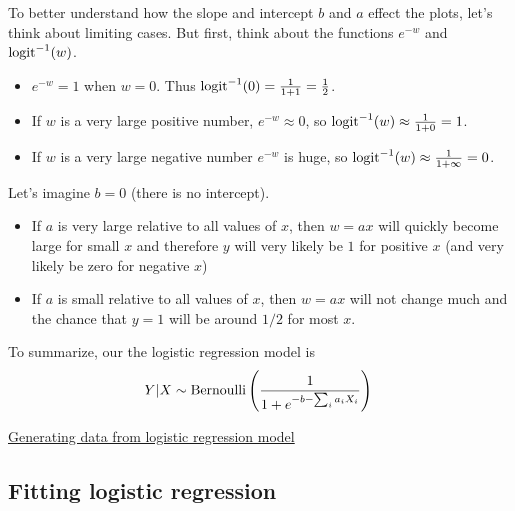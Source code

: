 To better understand how the slope and intercept $b$ and $a$ effect the plots, let's think about limiting cases. 
But first, think about the functions $e^{-w}$ and ${\rm logit}^{-1}(w)$. 

\begin{itemize}
\item $e^{-w} = 1$ when $w=0$. Thus $
{\rm logit}^{-1}(0) = \frac{1}{1 + 1} = \frac{1}{2}$.
\item  If $w$ is a very large positive number, $e^{-w} \approx 0$, so 
${\rm logit}^{-1}(w) \approx \frac{1}{1+0} = 1$.
\item  If $w$ is a very large negative number $e^{-w}$ is huge, so 
${\rm logit}^{-1}(w) \approx \frac{1}{1+\infty} = 0$.
\end{itemize}





Let's imagine $b=0$ (there is no intercept). 

\begin{itemize}
\item  If $a$ is very large relative to all values of $x$, then $w = ax$ will quickly become large for small $x$ and therefore $y$ will very likely be $1$ for positive $x$ (and very likely be zero for negative $x$)
\item  If $a$ is small relative to all values of $x$, then $w =ax$ will not change much and the chance that $y=1$ will be around $1/2$ for most $x$.
\end{itemize} 



To summarize, our the logistic regression model is 
\begin{equation}
Y|X \sim {\rm Bernoulli}\left(\frac{1}{1+e^{-b- \sum_i a_i X_i}}\right)\\
\end{equation}

\begin{example}
\href{https://colab.research.google.com/drive/1_oMrxtIlJ-EdW1ozmlydx0A9qrA-sVKm#scrollTo=YWs_K1GfF660}{Generating data from logistic regression model}
\end{example}




\subsection{Fitting logistic regression}

